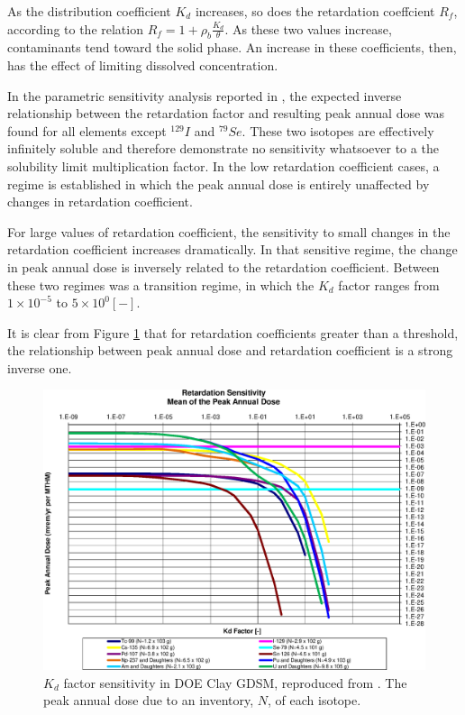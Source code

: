 

As the distribution coefficient $K_d$ increases, so does the retardation 
coeffcient $R_f$, according to the relation $R_f = 1+ \rho_b\frac{K_d}{\theta}$. As these two values increase, contaminants tend 
toward the solid phase. An increase in these coefficients, then, has the effect 
of limiting dissolved concentration.

In the parametric sensitivity analysis reported in \cite{huff_key_2012},
the expected inverse relationship between the retardation factor and resulting
peak annual dose was found for all elements except $^{129}I$ and $^{79}Se$. 
These two isotopes are  effectively infinitely soluble and therefore 
demonstrate no sensitivity whatsoever to a the solubility limit multiplication 
factor. In the low retardation coefficient cases, a regime is established in 
which the peak annual dose is entirely unaffected by changes in retardation 
coefficient.

For large values of retardation coefficient, the sensitivity to small changes
in the retardation coefficient increases dramatically. In that sensitive
regime, the change in peak annual dose is inversely related to the retardation
coefficient. Between these two regimes was a transition regime, in which the
$K_d$ factor ranges from $1\times10^{-5}$ to $5\times10^{0} [-]$.

It is clear from Figure \ref{fig:KdSumFactor} that
for retardation coefficients greater than a threshold, the
relationship between peak annual dose and retardation coefficient is a strong
inverse one.

\begin{figure}[ht]
\centering
\includegraphics[width=0.7\linewidth]{./results/images/Retardation_Summary_kdFactor.eps}
\caption[$K_d$ factor sensitivity in Clay GDSM]{$K_d$ factor sensitivity in 
        DOE Clay GDSM, reproduced from \cite{huff_key_2012}.
The peak annual dose due to an inventory,
$N$, of each isotope.}
\label{fig:KdSumFactor}
\end{figure}

\FloatBarrier

